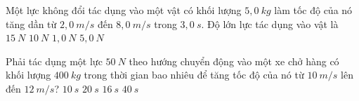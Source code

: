 \begin{ex}%
Một lực không đổi tác dụng vào một vật có khối lượng $5,0\ kg$ làm tốc độ của nó tăng dần từ $2,0\ m/s$ đến $8,0\ m/s$ trong $3,0\ s$. Độ lớn lực tác dụng vào vật là
\choice
{$15\ N$}
{\True $10\ N$}
{$1,0\ N$}
{$5,0\ N$}
  \end{ex}
\begin{ex}%
Phải tác dụng một lực $50\ N$ theo hướng chuyển động vào một xe chở hàng có khối lượng $400\ kg$ trong thời gian bao nhiêu để tăng tốc độ của nó từ $10\ m/s$ lên đến $12\ m/s$?
\choice
{$10\ s$}
{$20\ s$}
{\True $16\ s$}
{$40\ s$}
  \end{ex}
